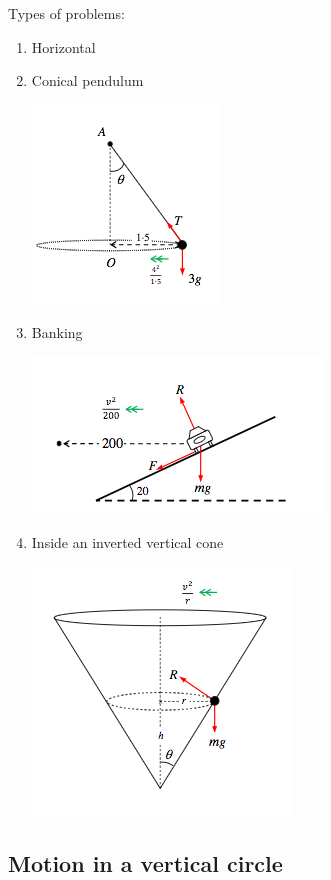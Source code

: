 \documentclass[a4paper]{article}
\begin{document}
Types of problems:
\begin{enumerate}
	\item Horizontal
    \item Conical pendulum
    \begin{center}
        \includegraphics[scale=0.5]{img_M/13_eg1}
    \end{center}
	\item Banking
    \begin{center}
        \includegraphics[scale=0.5]{img_M/13_eg2}
    \end{center}
	\item Inside an inverted vertical cone
    \begin{center}
        \includegraphics[scale=0.5]{img_M/13_eg3}
    \end{center}
\end{enumerate}

\subsection{Motion in a vertical circle}
\end{document}
